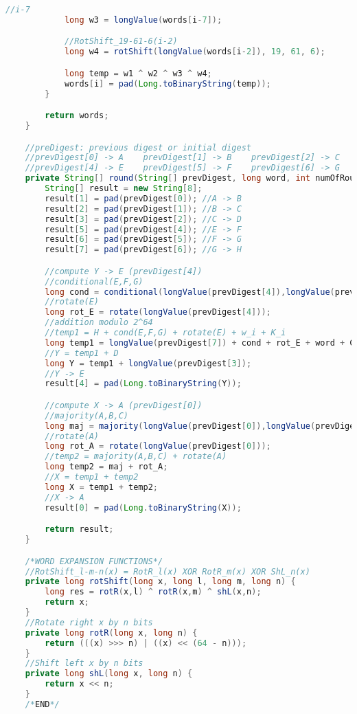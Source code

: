 \begin{lstlisting}[language=Java,basicstyle=\tiny,caption=Sha512.java]
            //i-7
            long w3 = longValue(words[i-7]);

            //RotShift_19-61-6(i-2)
            long w4 = rotShift(longValue(words[i-2]), 19, 61, 6);

            long temp = w1 ^ w2 ^ w3 ^ w4;
            words[i] = pad(Long.toBinaryString(temp));
        }

        return words;
    }

    //preDigest: previous digest or initial digest
    //prevDigest[0] -> A    prevDigest[1] -> B    prevDigest[2] -> C    prevDigest[3] -> D
    //prevDigest[4] -> E    prevDigest[5] -> F    prevDigest[6] -> G    prevDigest[7] -> H
    private String[] round(String[] prevDigest, long word, int numOfRounds) {
        String[] result = new String[8];
        result[1] = pad(prevDigest[0]); //A -> B
        result[2] = pad(prevDigest[1]); //B -> C
        result[3] = pad(prevDigest[2]); //C -> D
        result[5] = pad(prevDigest[4]); //E -> F
        result[6] = pad(prevDigest[5]); //F -> G
        result[7] = pad(prevDigest[6]); //G -> H

        //compute Y -> E (prevDigest[4])
        //conditional(E,F,G)
        long cond = conditional(longValue(prevDigest[4]),longValue(prevDigest[5]),longValue(prevDigest[6]));
        //rotate(E)
        long rot_E = rotate(longValue(prevDigest[4]));
        //addition modulo 2^64
        //temp1 = H + cond(E,F,G) + rotate(E) + w_i + K_i
        long temp1 = longValue(prevDigest[7]) + cond + rot_E + word + CONSTANTS[numOfRounds];
        //Y = temp1 + D
        long Y = temp1 + longValue(prevDigest[3]);
        //Y -> E
        result[4] = pad(Long.toBinaryString(Y));

        //compute X -> A (prevDigest[0])
        //majority(A,B,C)
        long maj = majority(longValue(prevDigest[0]),longValue(prevDigest[1]),longValue(prevDigest[2]));
        //rotate(A)
        long rot_A = rotate(longValue(prevDigest[0]));
        //temp2 = majority(A,B,C) + rotate(A)
        long temp2 = maj + rot_A;
        //X = temp1 + temp2
        long X = temp1 + temp2;
        //X -> A
        result[0] = pad(Long.toBinaryString(X));

        return result;
    }

    /*WORD EXPANSION FUNCTIONS*/
    //RotShift_l-m-n(x) = RotR_l(x) XOR RotR_m(x) XOR ShL_n(x)
    private long rotShift(long x, long l, long m, long n) {
        long res = rotR(x,l) ^ rotR(x,m) ^ shL(x,n);
        return x;
    }
    //Rotate right x by n bits
    private long rotR(long x, long n) {
        return (((x) >>> n) | ((x) << (64 - n)));
    }
    //Shift left x by n bits
    private long shL(long x, long n) {
        return x << n;
    }
    /*END*/


\end{lstlisting}
